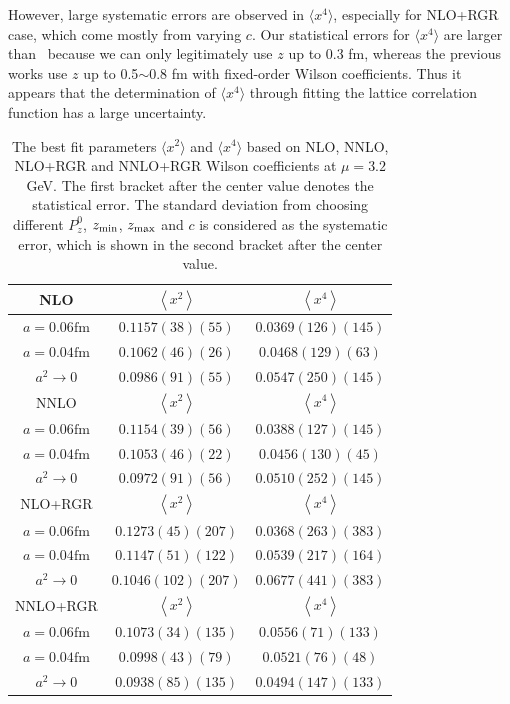 \documentclass[prd,aps,twocolumn,preprintnumbers, showpacs, nofootinbib,superscriptaddress,notitlepage]{revtex4-2}
\begin{document}
However, large systematic errors are observed in $\langle x^{4} \rangle$, especially for NLO+RGR case, which come mostly from varying $c$. Our statistical errors for $\langle x^{4} \rangle$ are larger than~\cite{Gao:2020ito,Gao:2021hxl,Gao:2022iex} because we can only legitimately use $z$ up to 0.3 fm, whereas the previous
works use $z$ up to 0.5$\sim$0.8 fm with fixed-order Wilson coefficients. Thus it appears that the determination of $\langle x^{4} \rangle$ through fitting the lattice correlation function has a large uncertainty.

\begin{table}[tbp]
\begin{tabular}{|c|c|c|}
\hline NLO & $\left\langle x^{2}\right\rangle$  & $\left\langle x^{4}\right\rangle$ \\
\hline $a=0.06 \mathrm{fm}$ & $0.1157(38)(55)$ & $0.0369(126)(145)$ \\
\hline $a=0.04 \mathrm{fm}$ & $0.1062(46)(26)$ & $0.0468(129)(63)$ \\
\hline$a^{2} \rightarrow 0$ & $0.0986(91)(55)$ & $0.0547(250)(145)$ \\
\hline
\hline

\hline NNLO & $\left\langle x^{2}\right\rangle$  & $\left\langle x^{4}\right\rangle$ \\
\hline $a=0.06 \mathrm{fm}$ & $0.1154(39)(56)$ & $0.0388(127)(145)$ \\
\hline $a=0.04 \mathrm{fm}$ & $0.1053(46)(22)$ & $0.0456(130)(45)$ \\
\hline$a^{2} \rightarrow 0$ & $0.0972(91)(56)$ & $0.0510(252)(145)$ \\
\hline
\hline

\hline NLO+RGR & $\left\langle x^{2}\right\rangle$ & $\left\langle x^{4}\right\rangle$ \\
\hline $a=0.06 \mathrm{fm}$ & $0.1273(45)(207)$ & $0.0368(263)(383)$ \\
\hline $a=0.04 \mathrm{fm}$ & $0.1147(51)(122)$ & $0.0539(217)(164)$ \\
\hline$a^{2} \rightarrow 0$ & $0.1046(102)(207)$ & $0.0677(441)(383)$ \\
\hline
\hline

\hline NNLO+RGR & $\left\langle x^{2}\right\rangle$ & $\left\langle x^{4}\right\rangle$ \\
\hline $a=0.06 \mathrm{fm}$ & $0.1073(34)(135)$ & $0.0556(71)(133)$ \\
\hline $a=0.04 \mathrm{fm}$ & $0.0998(43)(79)$ & $0.0521(76)(48)$ \\
\hline$a^{2} \rightarrow 0$ & $0.0938(85)(135)$ & $0.0494(147)(133)$ \\
\hline

\end{tabular}
\caption{The best fit parameters $\langle x^{2} \rangle$ and $\langle x^{4} \rangle$ based on NLO, NNLO, NLO+RGR and NNLO+RGR Wilson coefficients at $\mu=3.2$ GeV. The first bracket after the center value denotes the statistical error. The standard deviation from choosing different $P_{z}^0$, $z_{\rm min}$, $z_{\rm max}$ and $c$ is considered as the systematic error, which is shown in the second bracket after the center value.}
\label{tab:fitmoments}
\end{table}
\end{document}
